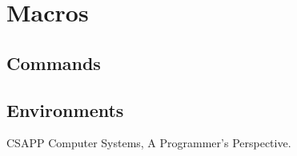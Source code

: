 \section{Macros}
\subsection{Commands}
\wjb



\subsection{Environments}
\begin{myquotation}{CSAPP}
    Computer Systems, A Programmer's Perspective.
\end{myquotation}